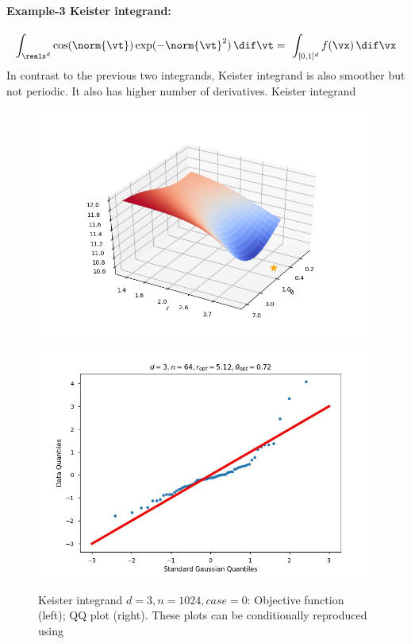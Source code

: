 \paragraph{
Example-3 Keister integrand:}
\begin{equation*}
\int_{\reals^d} \cos(\norm{\vt})\exp(-\norm{\vt}^2) \, \dif \vt
= \ \int_{[0,1]^{d}} 
f(\vx) \, 
\dif \vx 
\end{equation*}
In contrast to the previous two integrands, Keister integrand is also smoother but not periodic. It also has higher number of derivatives. Keister integrand 
\begin{figure}[ht]
	\centering
	\includegraphics[width=0.45\linewidth]{BayesCub/figures/Keister-ObjFun_n-64_d-3_case-0.jpg} \quad 
	\includegraphics[width=0.45\linewidth]{BayesCub/figures/Keister-QQPlot_n-64_d-3_case-0.jpg}
	\caption{Keister integrand $d=3, n=1024, case=0$: Objective function (left);  QQ plot (right).  These plots can be conditionally reproduced using }
	\label{fig:keister_plots}
\end{figure}